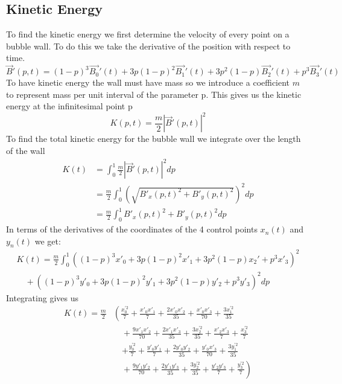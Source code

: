 \documentclass{article}
\begin{document}
\subsection{Kinetic Energy}
To find the kinetic energy we first determine the velocity of every point on a
bubble wall. To do this we take the derivative of the position with respect to
time.
\begin{displaymath}
\vec{B}'(p,t)=(1-p)^3\vec{B_0}'(t)+3p(1-p)^2\vec{B_1}'(t)+3p^2(1-p)\vec{B_2}'(t)+p^3\vec{B_3}'(t)
\end{displaymath}
To have kinetic energy the wall must have mass so we introduce a coefficient
$m$ to represent mass per unit interval of the parameter p. This gives us the kinetic energy at the
infinitesimal point p
\begin{displaymath}
K(p,t) = \frac{m}{2} \left|\vec{B}'(p,t)\right|^2
\end{displaymath}
To find the total kinetic energy for the bubble wall we integrate over the
length of the wall
\begin{align*}
K(t)&= \int_0^1 \frac{m}{2} \left|\vec{B}'(p,t)\right|^2 dp\\
&=\frac{m}{2} \int_0^1 \left(\sqrt{B'_x(p,t)^2+B'_y(p,t)^2}\right)^2 dp\\
&=\frac{m}{2} \int_0^1 B'_x(p,t)^2+B'_y(p,t)^2 dp
\end{align*}
In terms of the derivatives of the coordinates of the 4 control points $x_n(t)$
and $y_n(t)$ we get:
\begin{align*}
K(t)=\frac{m}{2} \int_0^1
\left((1-p)^3x'_0+3p(1-p)^2x'_1+3p^2(1-p)x_2'+p^3x'_3\right)^2 \\
 \quad+ \left((1-p)^3y'_0+3p(1-p)^2y'_1+3p^2(1-p)y'_2+p^3y'_3
\right)^2 dp
\end{align*}
Integrating gives us
\begin{align*}
K(t)=\frac{m}{2} &\left( 
\frac{x_0^{'2}}{7} + \frac{x'_0 x'_1}{7} + \frac{2 x'_0 x'_2}{35} + 
\frac{x'_0 x'_3}{70}  + \frac{3 x_1^{'2}}{35} \right.\\
&\left.\quad +\frac{9 x'_1 x'_2}{70} 
+ \frac{2 x'_1 x'_3}{35} + \frac{3 x_2^{'2}}{35} + \frac{x'_2 x'_3}{7} +\frac{x_3^{'2}}{7}\right.\\
&\quad\left. +\frac{y_0^{'2}}{7} + \frac{y'_0 y'_1}{7} + \frac{2 y'_0 y'_2}{35} + 
\frac{y'_0 x'_3}{70} + \frac{3 y_1^{'2}}{35} \right.\\
&\left.\quad  +\frac{9 y'_1 y'_2}{70} 
+ \frac{2 y'_1 y'_3}{35} + \frac{3 y_2^{'2}}{35} + \frac{y'_2 y'_3}{7}
+\frac{y_3^{'2}}{7}\right)
\end{align*}
\end{document}
